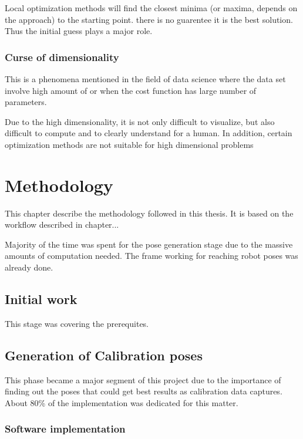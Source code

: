 \documentclass[english, printversion, nomenclature, notitle]{tuvisionthesis} %
\begin{document}
Local optimization methods will find the closest minima (or maxima, depends on the approach) to the starting point. there is no guarentee it is the best solution. Thus the initial guess plays a major role.

\subsection{Curse of dimensionality}
This is a phenomena mentioned in the field of data science where the data set involve high amount of or when the cost function has large number of parameters.

Due to the high dimensionality, it is not only difficult to visualize, but also difficult to compute and to clearly understand for a human. In addition, certain optimization methods are not suitable for high dimensional problems 

\chapter{Methodology}
This chapter describe the methodology followed in this thesis. It is based on the workflow described in chapter... 

Majority of the time was spent for the pose generation stage due to the massive amounts of computation needed. The frame working for reaching robot poses was already done. 

\section{Initial work}

This stage was covering the prerequites.

\section{Generation of Calibration poses}
This phase became a major segment of this project due to the importance of finding out the poses that could get best results as calibration data captures. About 80\% of the implementation was dedicated for this matter.

\subsection{Software implementation}
\end{document}
